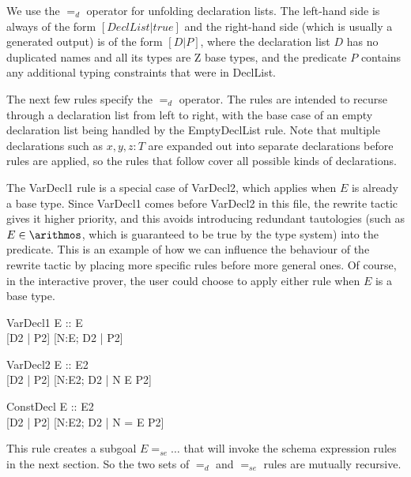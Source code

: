 \documentclass{article}
\newcommand{\sexprUnfoldsTo}{\mathrel{=_{se}}}
\newcommand{\declListUnfoldsTo}{\mathrel{=_d}}
\begin{document}
We use the $\declListUnfoldsTo$ operator for unfolding declaration
lists.   The left-hand side is always of the form $[DeclList|true]$
and the right-hand side (which is usually a generated output) is
of the form $[D|P]$, where the declaration list $D$ has no duplicated
names and all its types are Z base types, and the predicate $P$
contains any additional typing constraints that were in DeclList.

The next few rules specify the $\declListUnfoldsTo$ operator.
The rules are intended to recurse through a declaration list from left
to right, with the base case of an empty declaration list being handled
by the EmptyDeclList rule.  Note that multiple declarations such as
$x,y,z:T$ are expanded out into separate declarations before rules
are applied, so the rules that follow cover all possible kinds
of declarations.

The VarDecl1 rule is a special case of VarDecl2, which applies when $E$ is
already a base type.  Since VarDecl1 comes before VarDecl2 in this file,
the rewrite tactic gives it higher priority, and this avoids introducing
redundant tautologies (such as $E \in \arithmos$, which is guaranteed to
be true by the type system) into the predicate.  This is an example of
how we can influence the behaviour of the rewrite tactic by placing more
specific rules before more general ones.  Of course, in the interactive
prover, the user could choose to apply either rule when $E$ is a base type.

\begin{zedrule}{VarDecl1}
   E :: \power E \\
   [D1 | true] \declListUnfoldsTo [D2 | P2]
\derives
   [N:E; D1 | true] \declListUnfoldsTo [N:E; D2 |  P2]
\end{zedrule}

\begin{zedrule}{VarDecl2}
   E :: \power E2 \\
   [D1 | true] \declListUnfoldsTo [D2 | P2]
\derives
   [N:E; D1 | true] \declListUnfoldsTo [N:E2; D2 |  N \in E \land P2]
\end{zedrule}

\begin{zedrule}{ConstDecl}
   E :: E2 \\
   [D1 | true] \declListUnfoldsTo [D2 | P2]
\derives
   [N==E; D1 | true] \declListUnfoldsTo [N:E2; D2 |  N = E \land P2]
\end{zedrule}

This rule creates a subgoal $E \sexprUnfoldsTo \ldots$ that will
invoke the schema expression rules in the next section.  So the
two sets of $\declListUnfoldsTo$ and $\sexprUnfoldsTo$ rules are
mutually recursive.
\end{document}
